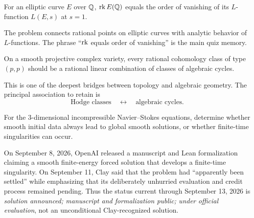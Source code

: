     \begin{conjecture}
        For an elliptic curve $E$ over $\mathbb{Q}$, $\operatorname{rk} E(\mathbb{Q})$ equals the order
        of vanishing of its $L$-function $L(E,s)$ at $s=1$.
    \end{conjecture}

    \begin{remark}
        The problem connects rational points on elliptic curves with analytic
        behavior of $L$-functions. The phrase ``$\operatorname{rk}$ equals order of vanishing''
        is the main quiz memory.
    \end{remark}

    \begin{conjecture}
        On a smooth projective complex variety, every rational cohomology class
        of type $(p,p)$ should be a rational linear combination of classes of
        algebraic cycles.
    \end{conjecture}

    \begin{remark}
        This is one of the deepest bridges between topology and algebraic
        geometry. The principal association to retain is
        \[
            \text{Hodge classes} \quad\longleftrightarrow\quad
            \text{algebraic cycles}.
        \]
    \end{remark}

    \begin{openproblem}
        For the $3$-dimensional incompressible Navier--Stokes equations,
        determine whether smooth initial data always lead to global smooth
        solutions, or whether finite-time singularities can occur.
    \end{openproblem}

    \begin{remark}
        On September 8, 2026, OpenAI released a manuscript and Lean
        formalization claiming a smooth finite-energy forced solution that
        develops a finite-time singularity. On September 11, Clay said that the
        problem had ``apparently been settled'' while emphasizing that its
        deliberately unhurried evaluation and credit process remained pending.
        Thus the status current through September 13, 2026 is
        \emph{solution announced; manuscript and formalization public; under
        official evaluation}, not an unconditional Clay-recognized solution.
    \end{remark}

